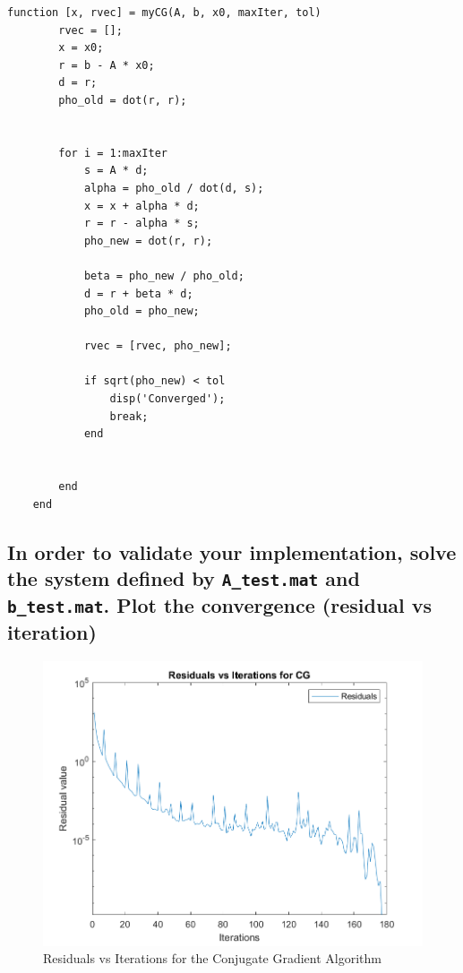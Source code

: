 \documentclass[unicode,11pt,a4paper,oneside,numbers=endperiod,openany]{scrartcl}
\begin{document}
\begin{lstlisting}[style=matlab, caption={Matlab function for Conjugate Gradient}, label={lst:myCG}]
    function [x, rvec] = myCG(A, b, x0, maxIter, tol)
        rvec = [];	
        x = x0;
        r = b - A * x0;
        d = r;
        pho_old = dot(r, r);
        
        
        for i = 1:maxIter
            s = A * d;
            alpha = pho_old / dot(d, s);
            x = x + alpha * d;
            r = r - alpha * s;
            pho_new = dot(r, r);

            beta = pho_new / pho_old;
            d = r + beta * d;
            pho_old = pho_new;
            
            rvec = [rvec, pho_new];

            if sqrt(pho_new) < tol
                disp('Converged');
                break;
            end
            
            
        end
    end
\end{lstlisting}

\subsection{In order to validate your implementation, solve the system defined by \texttt{A\_test.mat} and \texttt{b\_test.mat}. Plot the convergence (residual vs iteration)}

\begin{figure}[H]
    \centering
    \includegraphics[width=0.8\linewidth]{graphs/residuals.png}
    \caption{Residuals vs Iterations for the Conjugate Gradient Algorithm}
    \label{fig:residuals}
\end{figure}
\end{document}
